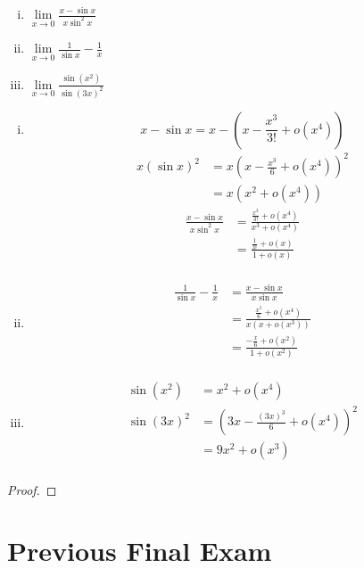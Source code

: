 \begin{question}{20}
  \text{}
  \begin{enumerate}[(i)]
    \item $\lim\limits_{x \to 0} \frac{x - \sin x}{x\sin^2 x}$
    \item $\lim\limits_{x \to 0} \frac{1}{\sin x} - \frac{1}{x}$
    \item $\lim\limits_{x \to 0} \frac{\sin(x^2)}{\sin(3x)^2}$
  \end{enumerate} 
\end{question}

  \begin{enumerate}[(i)]
    \item 
    \[x - \sin x = x - \left(x - \frac{x^3}{3!} + o(x^4)\right)\]
    \begin{align*}
      x(\sin x)^2 &= x\left(x - \frac{x^3}{6} + o(x^4)\right)^2 \\
      &= x(x^2 + o(x^4))
    \end{align*}
    \begin{align*}
      \frac{x - \sin x}{x\sin^2 x} &= \frac{\frac{x^3}{3!} + o(x^4)}{x^3 + o(x^4)} \\
      &= \frac{\frac{1}{3!} + o(x)}{1 + o(x)} \\
    \end{align*}
    \item \begin{align*}
      \frac{1}{\sin x} - \frac{1}{x} &= \frac{x - \sin x}{x \sin x} \\
      &= \frac{\frac{x^3}{6} + o(x^4)}{x(x + o(x^3))} \\
      &= \frac{-\frac{x}{6} + o(x^2)}{1+o(x^2)} \\
    \end{align*}
    \item \begin{align*}
      \sin(x^2) &= x^2 + o(x^4) \\
      \sin(3x)^2 &= \left(3x - \frac{(3x)^3}{6} + o(x^4)\right)^2 \\
      &= 9x^2 + o(x^3) \\
    \end{align*}
  \end{enumerate} 
\begin{proof}
\end{proof}

\section{Previous Final Exam}

